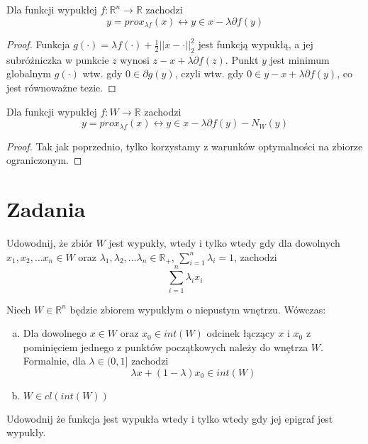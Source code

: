 \documentclass[10pt,a4paper,draft]{report}
\begin{document}
\begin{theorem}
Dla funkcji wypukłej $f : \mathbb{R}^n \rightarrow \mathbb{R}$ zachodzi 
\[
y = prox_{\lambda f}(x) \leftrightarrow y \in x - \lambda \partial f(y)
\]
\end{theorem}
\begin{proof}
Funkcja $g(\cdot) = \lambda f(\cdot) + \frac{1}{2} ||x - \cdot||_2^2$ jest funkcją wypukłą, a jej subróżniczka w punkcie $z$ wynosi $z - x + \lambda \partial f(z)$. Punkt $y$ jest minimum globalnym $g(\cdot)$ wtw. gdy $0 \in \partial g (y)$, czyli wtw. gdy $0 \in y - x + \lambda \partial f(y)$, co jest równoważne tezie.
\end{proof}
\begin{theorem}
Dla funkcji wypukłej $f : W \rightarrow \mathbb{R}$ zachodzi 
\[
y = prox_{\lambda f}(x) \leftrightarrow y \in x - \lambda \partial f(y) - N_W(y)
\]
\end{theorem}
\begin{proof}
Tak jak poprzednio, tylko korzystamy z warunków optymalności na zbiorze ograniczonym.
\end{proof}



\section{Zadania}
\begin{problem}
Udowodnij, że zbiór $W$ jest wypukły, wtedy i tylko wtedy gdy dla dowolnych $x_1, x_2, \ldots x_n \in W$ oraz $\lambda_1, \lambda_2, \ldots \lambda_n \in \mathbb{R}_+$, $\sum_{i=1}^n \lambda_i = 1$, zachodzi
\[
\sum_{i=1}^n \lambda_i x_i
\]
\end{problem}
\begin{problem}
Niech $W \in \mathbb{R}^n$ będzie zbiorem wypukłym o niepustym wnętrzu. Wówczas:
\begin{enumerate}[a)]

\item Dla dowolnego $x \in W$ oraz $x_0 \in int(W)$ odcinek łączący $x$ i $x_0$ z pominięciem jednego z punktów początkowych należy do wnętrza $W$. Formalnie, dla $\lambda \in (0, 1]$ zachodzi
\[
\lambda x + (1 - \lambda) x_0 \in int(W)
\]

\item $W \in cl(int(W))$
\end{enumerate}
\end{problem}
\begin{problem}
Udowodnij że funkcja jest wypukła wtedy i tylko wtedy gdy jej epigraf jest wypukły.
\end{problem}
\end{document}
